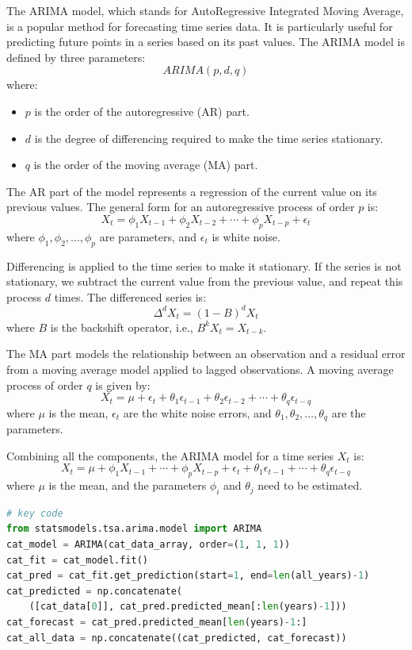 \documentclass[withoutpreface,bwprint]{cumcmthesis} %
\begin{document}
\begin{definition}
The ARIMA model, which stands for AutoRegressive Integrated Moving Average, is a popular method for forecasting time series data. It is particularly useful for predicting future points in a series based on its past values. The ARIMA model is defined by three parameters:
\[
ARIMA(p, d, q)
\]
where:
\begin{itemize}
    \item \( p \) is the order of the autoregressive (AR) part.
    \item \( d \) is the degree of differencing required to make the time series stationary.
    \item \( q \) is the order of the moving average (MA) part.
\end{itemize}

The AR part of the model represents a regression of the current value on its previous values. The general form for an autoregressive process of order \( p \) is:
\[
X_t = \phi_1 X_{t-1} + \phi_2 X_{t-2} + \cdots + \phi_p X_{t-p} + \epsilon_t
\]
where \( \phi_1, \phi_2, \dots, \phi_p \) are parameters, and \( \epsilon_t \) is white noise.

Differencing is applied to the time series to make it stationary. If the series is not stationary, we subtract the current value from the previous value, and repeat this process \( d \) times. The differenced series is:
\[
\Delta^d X_t = (1 - B)^d X_t
\]
where \( B \) is the backshift operator, i.e., \( B^k X_t = X_{t-k} \).

The MA part models the relationship between an observation and a residual error from a moving average model applied to lagged observations. A moving average process of order \( q \) is given by:
\[
X_t = \mu + \epsilon_t + \theta_1 \epsilon_{t-1} + \theta_2 \epsilon_{t-2} + \cdots + \theta_q \epsilon_{t-q}
\]
where \( \mu \) is the mean, \( \epsilon_t \) are the white noise errors, and \( \theta_1, \theta_2, \dots, \theta_q \) are the parameters.

Combining all the components, the ARIMA model for a time series \( X_t \) is:
\[
X_t = \mu + \phi_1 X_{t-1} + \cdots + \phi_p X_{t-p} + \epsilon_t + \theta_1 \epsilon_{t-1} + \cdots + \theta_q \epsilon_{t-q}
\]
where \( \mu \) is the mean, and the parameters \( \phi_i \) and \( \theta_j \) need to be estimated.
\end{definition}

\begin{lstlisting}[language=python]
# key code
from statsmodels.tsa.arima.model import ARIMA
cat_model = ARIMA(cat_data_array, order=(1, 1, 1))
cat_fit = cat_model.fit()
cat_pred = cat_fit.get_prediction(start=1, end=len(all_years)-1)
cat_predicted = np.concatenate(
    ([cat_data[0]], cat_pred.predicted_mean[:len(years)-1]))
cat_forecast = cat_pred.predicted_mean[len(years)-1:]
cat_all_data = np.concatenate((cat_predicted, cat_forecast))
\end{lstlisting}
\end{document}
